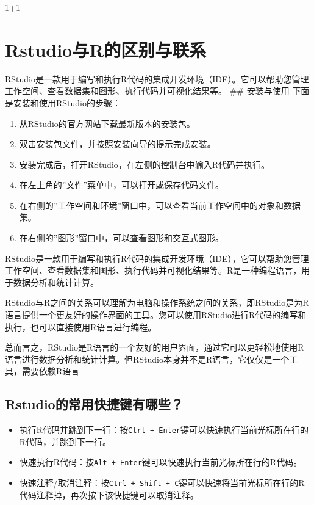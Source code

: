 \documentclass[
  letterpaper,
  DIV=11,
  numbers=noendperiod]{scrreprt}
\newenvironment{Shaded}{\begin{snugshade}}{\end{snugshade}}
\newcommand{\DecValTok}[1]{\textcolor[rgb]{0.68,0.00,0.00}{#1}}
\newcommand{\SpecialCharTok}[1]{\textcolor[rgb]{0.37,0.37,0.37}{#1}}
\begin{document}
\begin{Shaded}
\begin{Highlighting}[]
\DecValTok{1}\SpecialCharTok{+}\DecValTok{1}
\end{Highlighting}
\end{Shaded}

\chapter{Rstudio与R的区别与联系}\label{rstudioux4e0erux7684ux533aux522bux4e0eux8054ux7cfb}

RStudio是一款用于编写和执行R代码的集成开发环境（IDE）。它可以帮助您管理工作空间、查看数据集和图形、执行代码并可视化结果等。
\#\# 安装与使用 下面是安装和使用RStudio的步骤：

\begin{enumerate}
\def\labelenumi{\arabic{enumi}.}
\item
  从RStudio的\href{https://posit.co/downloads/}{官方网站}下载最新版本的安装包。
\item
  双击安装包文件，并按照安装向导的提示完成安装。
\item
  安装完成后，打开RStudio，在左侧的控制台中输入R代码并执行。
\item
  在左上角的''文件''菜单中，可以打开或保存代码文件。
\item
  在右侧的''工作空间和环境''窗口中，可以查看当前工作空间中的对象和数据集。
\item
  在右侧的''图形''窗口中，可以查看图形和交互式图形。
\end{enumerate}

RStudio是一款用于编写和执行R代码的集成开发环境（IDE），它可以帮助您管理工作空间、查看数据集和图形、执行代码并可视化结果等。R是一种编程语言，用于数据分析和统计计算。

RStudio与R之间的关系可以理解为电脑和操作系统之间的关系，即RStudio是为R语言提供一个更友好的操作界面的工具。您可以使用RStudio进行R代码的编写和执行，也可以直接使用R语言进行编程。

总而言之，RStudio是R语言的一个友好的用户界面，通过它可以更轻松地使用R语言进行数据分析和统计计算。但RStudio本身并不是R语言，它仅仅是一个工具，需要依赖R语言

\section{Rstudio的常用快捷键有哪些？}\label{rstudioux7684ux5e38ux7528ux5febux6377ux952eux6709ux54eaux4e9b}

\begin{itemize}
\item
  执行R代码并跳到下一行：按\texttt{Ctrl\ +\ Enter}键可以快速执行当前光标所在行的R代码，并跳到下一行。
\item
  快速执行R代码：按\texttt{Alt\ +\ Enter}键可以快速执行当前光标所在行的R代码。
\item
  快速注释/取消注释：按\texttt{Ctrl\ +\ Shift\ +\ C}键可以快速将当前光标所在行的R代码注释掉，再次按下该快捷键可以取消注释。
\end{itemize}
\end{document}
